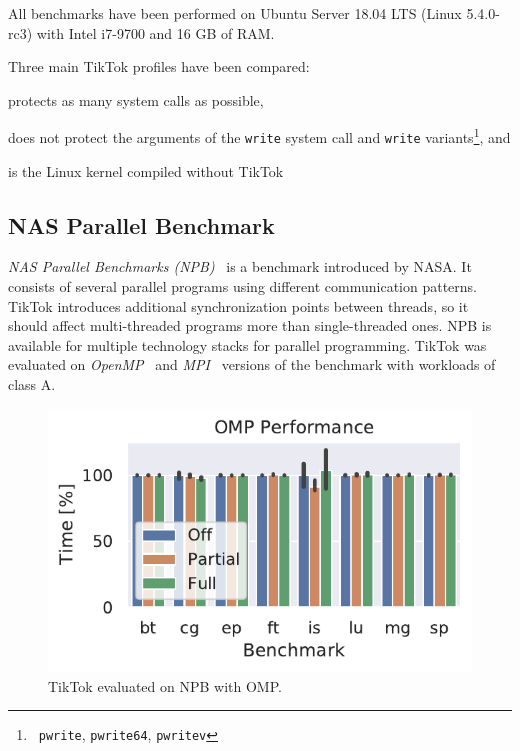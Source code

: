 \documentclass[conference]{IEEEtran}
\newcommand{\sysname}{TikTok}
\begin{document}
All benchmarks have been performed on Ubuntu Server 18.04 LTS (Linux 5.4.0-rc3)
with Intel i7-9700 and 16 GB of RAM.

Three main \sysname{} profiles have been compared:
\begin{LaTeXdescription}
  \item[\sysname{} On] protects as many system calls as possible,
  \item[\sysname{} Partial] does not protect the arguments of the \texttt{write}
system call and \texttt{write} variants\footnote{~\texttt{pwrite}, \texttt{pwrite64}, \texttt{pwritev}}, and
  \item[\sysname{} Off] is the Linux kernel compiled without \sysname{}  
\end{LaTeXdescription}

\subsection{NAS Parallel Benchmark}
\label{subsec:npb}

\emph{NAS Parallel Benchmarks (NPB)}~\cite{npb} is a benchmark introduced by
NASA. It consists of several parallel programs using different communication
patterns. \sysname{} introduces additional synchronization points between
threads, so it should affect multi-threaded programs more than single-threaded
ones. NPB is available for multiple technology stacks for parallel programming.
\sysname{} was evaluated on \emph{OpenMP}~\cite{dagum1998openmp} and
\emph{MPI}~\cite{snir1998mpi} versions of the benchmark with workloads of class
A.

\begin{figure}[]
  \centering
  \includegraphics[width=\linewidth]{img/omp_graph.pdf}
  \caption{\sysname{} evaluated on NPB with OMP.
}
  \label{fig:npbomp}
\end{figure}
\end{document}
